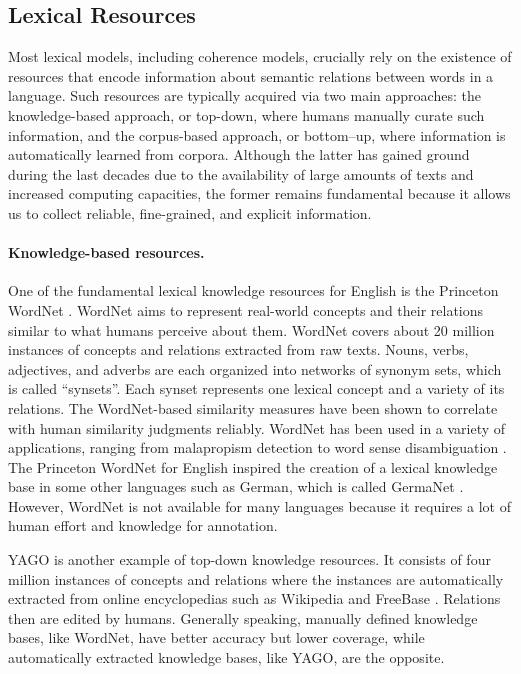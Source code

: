 \subsection{Lexical Resources} 

Most lexical models, including coherence models, crucially rely on the existence of resources that encode information about semantic relations between words in a language. 
Such resources are typically acquired via two main approaches: the knowledge-based approach, or top-down, where humans manually curate such information, and the corpus-based approach, or bottom–up, where information is automatically learned from corpora. 
Although the latter has gained ground during the last decades due to the availability of large amounts of texts and increased computing capacities, the former remains fundamental because it allows us to collect reliable, fine-grained, and explicit information. 

\paragraph{Knowledge-based resources.}
One of the fundamental lexical knowledge resources for English is the Princeton WordNet \cite{fellbaum98}.  
WordNet aims to represent real-world concepts and their relations similar to what humans perceive about them. 
WordNet covers about 20 million instances of concepts and relations extracted from raw texts. 
Nouns, verbs, adjectives, and adverbs are each organized into networks of synonym sets, which is called ``synsets''. 
Each synset represents one lexical concept and a variety of its relations. 
The WordNet-based similarity measures have been shown to correlate with human similarity judgments reliably. 
WordNet has been used in a variety of applications, ranging from malapropism detection to word sense disambiguation \cite{budanitsky06}.  
The Princeton WordNet for English inspired the creation of a lexical knowledge base in some other languages such as German, which is called GermaNet \cite{hamp97}. 
However, WordNet is not available for many languages because it requires a lot of human effort and knowledge for annotation. 

YAGO \cite{hoffart13} is another example of top-down knowledge resources.  
It consists of four million instances of concepts and relations where the instances are automatically extracted from online encyclopedias such as Wikipedia \cite{denoyer06} and FreeBase \cite{bollacker08}. 
Relations then are edited by humans. 
Generally speaking, manually defined knowledge bases, like WordNet, have better accuracy but lower coverage, while automatically extracted knowledge bases, like YAGO, are the opposite. 

